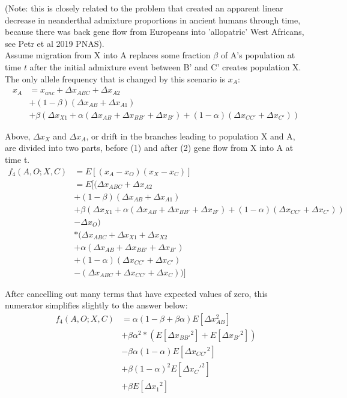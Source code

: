 \documentclass[12pt]{report}
\begin{document}
\begin{enumerate}
	(Note: this is closely related to the problem that created an apparent linear decrease in neanderthal admixture proportions in ancient humans through time, because there was back gene flow from Europeans into 'allopatric' West Africans, see Petr et al 2019 PNAS). \\
	Assume migration from X into A replaces some fraction $\beta$ of A's population at time $t$ after the initial admixture event between B' and C' creates population X. The only allele frequency that is changed by this scenario is $x_A$:
	\begin{align*}
	x_A &= x_{anc} + \Delta{x_{ABC}} + \Delta{x_{A2}} \\
	&+ (1 - \beta)(\Delta{x_{AB}} + \Delta{x_{A1}}) \\
	&+ \beta(\Delta{x_{X1}} + \alpha(\Delta{x_{AB}} + \Delta{x_{BB'}} + \Delta{x_{B'}}) + (1 - \alpha)(\Delta{x_{CC'}} + \Delta{x_{C'}}))
	\end{align*}
	
	Above, $\Delta{x_X}$ and $\Delta{x_A}$, or drift in the branches leading to population X and A, are divided into two parts, before (1) and after (2) gene flow from X into A at time t.\\
	
	\begin{align*}
	f_4(A,O;X,C) &= E[(x_A - x_O)(x_X - x_C)] \\
	&= E[(\Delta{x_{ABC}} + \Delta{x_{A2}} \\
	&+ (1 - \beta)(\Delta{x_{AB}} + \Delta{x_{A1}}) \\
	&+ \beta(\Delta{x_{X1}} + \alpha(\Delta{x_{AB}} + \Delta{x_{BB'}} + \Delta{x_{B'}}) + (1 - \alpha)(\Delta{x_{CC'}} + \Delta{x_{C'}})) \\
	&- \Delta{x_{O}}) \\
	&*(\Delta{x_{ABC}} + \Delta{x_{X1}} + \Delta{x_{X2}} \\
	&+ \alpha(\Delta{x_{AB}} + \Delta{x_{BB'}} + \Delta{x_{B'}}) \\
	&+ (1 - \alpha)(\Delta{x_{CC'}} + \Delta{x_{C'}}) \\
	&- (\Delta{x_{ABC}} + \Delta{x_{CC'}} + \Delta{x_C}))]
	\end{align*}
	
	After cancelling out many terms that have expected values of zero, this numerator simplifies slightly to the answer below:
	\begin{align*}
	f_4(A,O;X,C) &= \alpha(1 - \beta + \beta\alpha)E[\Delta{x_{AB}^2}]\\
	&+ \beta\alpha^2*(E[\Delta{x_{BB'}}^2] + E[\Delta{x_{B'}}^2])\\ 
	&-\beta\alpha(1-\alpha)E[\Delta{x_{CC'}}^2] \\
	&+ \beta(1-\alpha)^2E[\Delta{x_C'}^2] \\
	&+ \beta E[\Delta{x_1}^2]
	\end{align*}


\end{enumerate}
\end{document}
